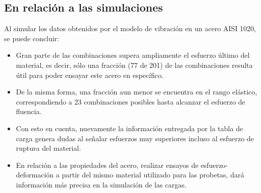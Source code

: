 \subsection{En relación a las simulaciones}
Al simular los datos obtenidos por el modelo de vibración en un acero AISI 1020, se puede concluir:
\begin{itemize}
	\item Gran parte de las combinaciones supera ampliamente el esfuerzo último del material, es decir, sólo una fracción (77 de 201) de las combinaciones resulta útil para poder ensayar este acero en específico.
	\item De la misma forma, una fracción aun menor se encuentra en el rango elástico, correspondiendo a 23 combinaciones posibles hasta alcanzar el esfuerzo de fluencia.
	\item Con esto en cuenta, nuevamente la información entregada por la tabla de carga genera dudas al señalar esfuerzos muy superiores incluso al esfuerzo de ruptura del material.
	\item En relación a las propiedades del acero, realizar ensayos de esfuerzo-deformación a partir del mismo material utilizado para las probetas, dará información más precisa en la simulación de las cargas.
\end{itemize}



